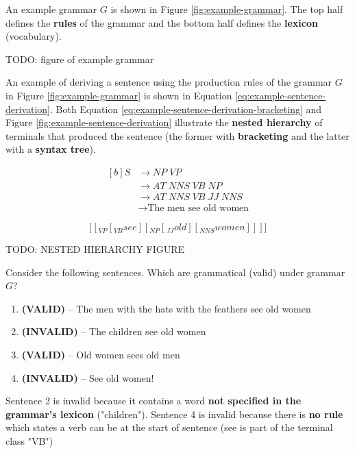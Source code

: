\documentclass{article}
\begin{document}
An example grammar $G$ is shown in Figure \ref{fig:example-grammar}. The top half defines the \textbf{rules} of the grammar and the bottom half defines the \textbf{lexicon} (vocabulary).

TODO: figure of example grammar

An example of deriving a sentence using the production rules of the grammar $G$ in Figure \ref{fig:example-grammar} is shown in Equation \ref{eq:example-sentence-derivation}. Both Equation \ref{eq:example-sentence-derivation-bracketing} and Figure \ref{fig:example-sentence-derivation} illustrate the \textbf{nested hierarchy} of terminals that produced the sentence (the former with \textbf{bracketing} and the latter with a \textbf{syntax tree}).

\begin{equation}
\begin{aligned}[b]
	S &\rightarrow NP\; VP \\
	&\rightarrow AT \; NNS \; VB \; NP \\
	&\rightarrow AT \; NNS \; VB \; JJ \; NNS \\
	&\rightarrow \text{The men see old women}
	\label{eq:example-sentence-derivation}
\end{aligned}
\end{equation}

\begin{equation}
	[_{S}[_{NP}[_{AT}the] [_{NNS}men]] [_{VP}[_{VB}see] [_{NP}[_{JJ}old] [_{NNS}women]]]]
	\label{eq:example-sentence-derivation-bracketing}
\end{equation}

TODO: NESTED HIERARCHY FIGURE

Consider the following sentences. Which are grammatical (valid) under grammar $G$?
\begin{enumerate}
	\item \textbf{(VALID)} -- The men with the hats with the feathers see old women
	\item \textbf{(INVALID)} -- The children see old women
	\item \textbf{(VALID)}  -- Old women sees old men
	\item \textbf{(INVALID)} -- See old women!
\end{enumerate}
Sentence 2 is invalid because it contains a word \textbf{not specified in the grammar's lexicon} ("children").  Sentence 4 is invalid because there is \textbf{no rule} which states a verb can be at the start of sentence (see is part of the terminal class "VB")
\end{document}
